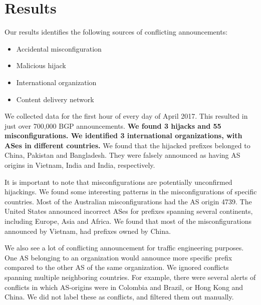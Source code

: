  \section{Results}\label{sec:results}
 
Our results identifies the following sources of conflicting announcements:
\begin{itemize}
\item Accidental misconfiguration
\item Malicious hijack
\item International organization
\item Content delivery network
\end{itemize}

We collected data for the first hour of every day of April 2017. This resulted in just over 700,000 BGP announcements. \textbf{We found 3 hijacks and 55 misconfigurations. We identified 3 international organizations, with ASes in different countries.} We found that the hijacked prefixes belonged to China, Pakistan and Bangladesh. They were falsely announced as having AS origins in Vietnam, India and India, respectively.

It is important to note that misconfigurations are potentially unconfirmed hijackings. We found some interesting patterns in the misconfigurations of specific countries. Most of the Australian misconfigurations had the AS origin 4739. The United States announced incorrect ASes for prefixes spanning several continents, including Europe, Asia and Africa. We found that most of the misconfigurations announced by Vietnam, had prefixes owned by China. 

We also see a lot of conflicting announcement for traffic engineering purposes. One AS belonging to an organization would announce more specific prefix compared to the other AS of the same organization. We ignored conflicts spanning multiple neighboring countries. For example, there were several alerts of conflicts in which AS-origins were in Colombia and Brazil, or Hong Kong and China. We did not label these as conflicts, and filtered them out manually.

